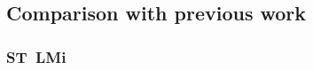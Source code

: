 \providecommand{\PH}[1]{\textbf{[NUMBER: #1]}}

\subsection{Comparison with previous work} \label{sec:comparison}

\subsubsection{ST~LMi}

